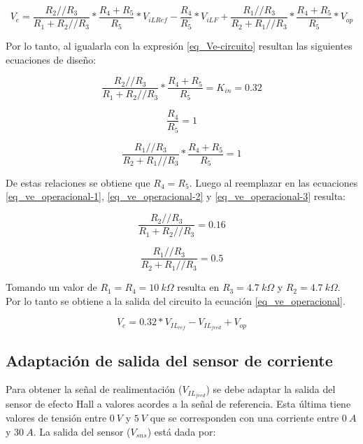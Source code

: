 \begin{equation*}
	V_e = \frac{R_{2}//R_{3}}{R_{1}+R_{2}//R_{3}}*\frac{R_{4}+R_{5}}{R_{5}}*V_{iLRef}-\frac{R_{4}}{R_{5}}*V_{iLF}+\frac{R_{1}//R_{3}}{R_{2}+R_{1}//R_{3}}*\frac{R_{4}+R_{5}}{R_{5}}* V_{op}
\end{equation*}

Por lo tanto, al igualarla con la expresión \ref{eq_Ve-circuito} resultan las siguientes ecuaciones de diseño:

\begin{equation} \label{eq_ve_operacional-1}
	\frac{R_{2}//R_{3}}{R_{1}+R_{2}//R_{3}}*\frac{R_{4}+R_{5}}{R_{5}} = K_{in} = 0.32
\end{equation}

\begin{equation} \label{eq_ve_operacional-2}
	\frac{R_{4}}{R_{5}} = 1
\end{equation}

\begin{equation} \label{eq_ve_operacional-3}
	\frac{R_{1}//R_{3}}{R_{2}+R_{1}//R_{3}}*\frac{R_{4}+R_{5}}{R_{5}} = 1
\end{equation}

De estas relaciones se obtiene que $R_{4}=R_{5}$. Luego al reemplazar en las ecuaciones \ref{eq_ve_operacional-1}, \ref{eq_ve_operacional-2} y \ref{eq_ve_operacional-3} resulta:

\begin{equation*}
	\frac{R_{2}//R_{3}}{R_{1}+R_{2}//R_{3}}= 0.16
\end{equation*}

\begin{equation*}
	\frac{R_{1}//R_{3}}{R_{2}+R_{1}//R_{3}}= 0.5
\end{equation*}

Tomando un valor de $R_{1} = R_{4} = 10\:k\Omega$ resulta en $R_{3}=4.7\:k\Omega$ y $R_{2}=4.7\:k\Omega$. Por lo tanto se obtiene a la salida del circuito la ecuación \ref{eq_ve_operacional}.

\begin{equation} \label{eq_ve_operacional}
	V_e = 0.32 * V_{IL_{ref}} - V_{IL_{feed}} + V_{op}
\end{equation}


\subsection{Adaptación de salida del sensor de corriente}

Para obtener la señal de realimentación ($V_{IL_{feed}}$) se debe adaptar la salida del sensor de efecto Hall a valores acordes a la señal de referencia. Esta última tiene valores de tensión entre $0\:V$ y $5\:V$ que se corresponden con una corriente entre $0\:A$ y $30\:A$. La salida del sensor ($V_{sns}$) está dada por:

